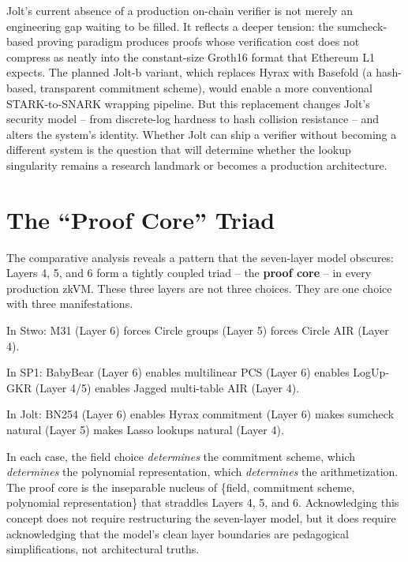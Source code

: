 \documentclass[
  11pt,
  openany]{report}
\renewcommand{\textbf}[1]{{\bfseries\color{MidnightBold}#1}}
\begin{document}
Jolt's current absence of a production on-chain verifier is not merely an
engineering gap waiting to be filled. It reflects a deeper tension: the
sumcheck-based proving paradigm produces proofs whose verification cost does not
compress as neatly into the constant-size Groth16 format that Ethereum L1
expects. The planned Jolt-b variant, which replaces Hyrax with Basefold (a
hash-based, transparent commitment scheme), would enable a more conventional
STARK-to-SNARK wrapping pipeline. But this replacement changes Jolt's security
model -- from discrete-log hardness to hash collision resistance -- and alters
the system's identity. Whether Jolt can ship a verifier without becoming a
different system is the question that will determine whether the lookup
singularity remains a research landmark or becomes a production architecture.

\section{The ``Proof Core'' Triad}\label{the-proof-core-triad}

The comparative analysis reveals a pattern that the seven-layer model obscures:
Layers 4, 5, and 6 form a tightly coupled triad -- the \textbf{proof core} -- in
every production zkVM. These three layers are not three choices. They are one
choice with three manifestations.

In Stwo: M31 (Layer 6) forces Circle groups (Layer 5) forces Circle AIR (Layer
4).

In SP1: BabyBear (Layer 6) enables multilinear PCS (Layer 6) enables LogUp-GKR
(Layer 4/5) enables Jagged multi-table AIR (Layer 4).

In Jolt: BN254 (Layer 6) enables Hyrax commitment (Layer 6) makes sumcheck
natural (Layer 5) makes Lasso lookups natural (Layer 4).

In each case, the field choice \emph{determines} the commitment scheme, which
\emph{determines} the polynomial representation, which \emph{determines} the
arithmetization. The proof core is the inseparable nucleus of \{field,
commitment scheme, polynomial representation\} that straddles Layers 4, 5, and
6. Acknowledging this concept does not require restructuring the seven-layer
model, but it does require acknowledging that the model's clean layer boundaries
are pedagogical simplifications, not architectural truths.
\end{document}
